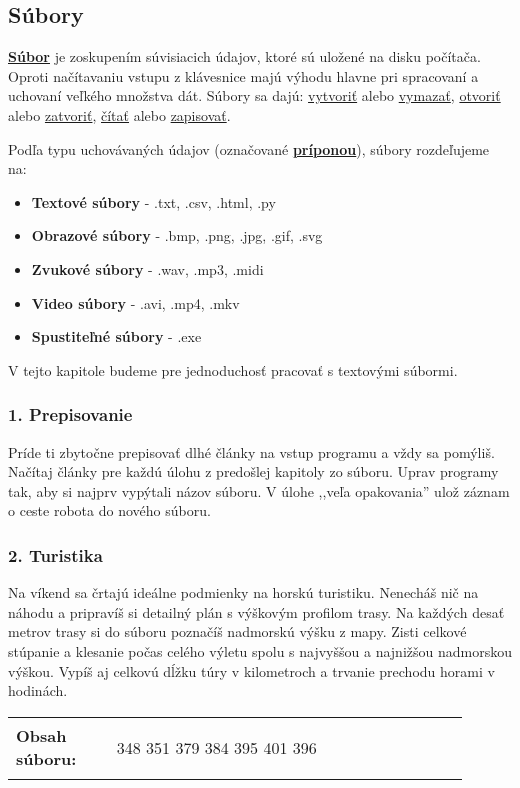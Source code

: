 \subsection{Súbory}
\underline{\textbf{Súbor}} je zoskupením súvisiacich údajov, ktoré sú uložené na disku počítača. Oproti načítavaniu vstupu z klávesnice majú výhodu hlavne pri spracovaní a uchovaní veľkého množstva dát. Súbory sa dajú: \underline{vytvoriť} alebo \underline{vymazať}, \underline{otvoriť} alebo \underline{zatvoriť}, \underline{čítať} alebo \underline{zapisovať}.

Podľa typu uchovávaných údajov (označované \underline{\textbf{príponou}}), súbory rozdeľujeme na:
\begin{itemize}[noitemsep]
\item \textbf{Textové súbory} - .txt, .csv, .html, .py
\item \textbf{Obrazové súbory} - .bmp, .png, .jpg, .gif, .svg
\item \textbf{Zvukové súbory} - .wav, .mp3, .midi
\item \textbf{Video súbory} - .avi, .mp4, .mkv
\item \textbf{Spustiteľné súbory} - .exe
\end{itemize}
V tejto kapitole budeme pre jednoduchosť pracovať s textovými súbormi.

\subsubsection*{1. Prepisovanie}
Príde ti zbytočne prepisovať dlhé články na vstup programu a vždy sa pomýliš. Načítaj články pre každú úlohu z predošlej kapitoly zo súboru. Uprav programy tak, aby si najprv vypýtali názov súboru. V úlohe ,,veľa opakovania'' ulož záznam o ceste robota do nového súboru.


\subsubsection*{2. Turistika}
Na víkend sa črtajú ideálne podmienky na horskú turistiku. Nenecháš nič na náhodu a pripravíš si detailný plán s výškovým profilom trasy. Na každých desať metrov trasy si do súboru poznačíš nadmorskú výšku z mapy. Zisti celkové stúpanie a klesanie počas celého výletu spolu s najvyššou a najnižšou nadmorskou výškou. Vypíš aj celkovú dĺžku túry v kilometroch a trvanie prechodu horami v hodinách.

\begin{tabular}{@{}p{0.2\linewidth}p{0.7\linewidth}}
\textbf{\small Obsah súboru:} &
\vspace{-3em}
\begin{code}
348
351
379
384
395
401
396
\end{code}
\end{tabular}

